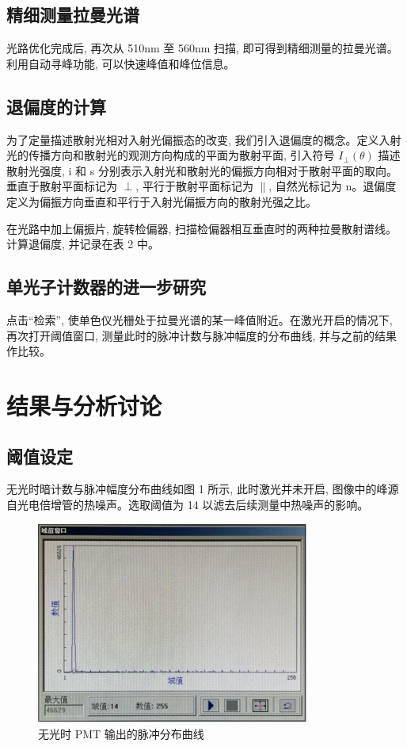 \documentclass{article}
\begin{document}
\subsection{精细测量拉曼光谱}

光路优化完成后, 再次从 510nm 至 560nm 扫描, 即可得到精细测量的拉曼光谱。利用自动寻峰功能, 可以快速峰值和峰位信息。

\subsection{退偏度的计算}

为了定量描述散射光相对入射光偏振态的改变, 我们引入退偏度的概念。定义入射光的传播方向和散射光的观测方向构成的平面为散射平面, 引入符号 $I_\perp(\theta)$ 描述散射光强度, i 和 s 分别表示入射光和散射光的偏振方向相对于散射平面的取向。垂直于散射平面标记为 $\perp$, 平行于散射平面标记为 $\parallel$, 自然光标记为 n。退偏度定义为偏振方向垂直和平行于入射光偏振方向的散射光强之比。

在光路中加上偏振片, 旋转检偏器, 扫描检偏器相互垂直时的两种拉曼散射谱线。计算退偏度, 并记录在表 2 中。

\subsection{单光子计数器的进一步研究}

点击“检索”, 使单色仪光栅处于拉曼光谱的某一峰值附近。在激光开启的情况下, 再次打开阈值窗口, 测量此时的脉冲计数与脉冲幅度的分布曲线, 并与之前的结果作比较。

\section{结果与分析讨论}

\subsection{阈值设定}

无光时暗计数与脉冲幅度分布曲线如图 1 所示, 此时激光并未开启, 图像中的峰源自光电倍增管的热噪声。选取阈值为 14 以滤去后续测量中热噪声的影响。

\begin{figure}[H]
    \centering
    \includegraphics[width=0.8\textwidth]{图片 1.jpg} %
    \caption{无光时 PMT 输出的脉冲分布曲线}
    \label{fig:pmt_dark_count}
\end{figure}
\end{document}
